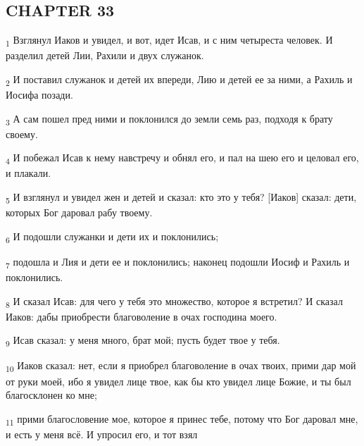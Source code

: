 \subsection{CHAPTER 33}
\begin{tcolorbox}
\textsubscript{1} Взглянул Иаков и увидел, и вот, идет Исав, и с ним четыреста человек. И разделил детей Лии, Рахили и двух служанок.
\end{tcolorbox}
\begin{tcolorbox}
\textsubscript{2} И поставил служанок и детей их впереди, Лию и детей ее за ними, а Рахиль и Иосифа позади.
\end{tcolorbox}
\begin{tcolorbox}
\textsubscript{3} А сам пошел пред ними и поклонился до земли семь раз, подходя к брату своему.
\end{tcolorbox}
\begin{tcolorbox}
\textsubscript{4} И побежал Исав к нему навстречу и обнял его, и пал на шею его и целовал его, и плакали.
\end{tcolorbox}
\begin{tcolorbox}
\textsubscript{5} И взглянул и увидел жен и детей и сказал: кто это у тебя? [Иаков] сказал: дети, которых Бог даровал рабу твоему.
\end{tcolorbox}
\begin{tcolorbox}
\textsubscript{6} И подошли служанки и дети их и поклонились;
\end{tcolorbox}
\begin{tcolorbox}
\textsubscript{7} подошла и Лия и дети ее и поклонились; наконец подошли Иосиф и Рахиль и поклонились.
\end{tcolorbox}
\begin{tcolorbox}
\textsubscript{8} И сказал Исав: для чего у тебя это множество, которое я встретил? И сказал Иаков: дабы приобрести благоволение в очах господина моего.
\end{tcolorbox}
\begin{tcolorbox}
\textsubscript{9} Исав сказал: у меня много, брат мой; пусть будет твое у тебя.
\end{tcolorbox}
\begin{tcolorbox}
\textsubscript{10} Иаков сказал: нет, если я приобрел благоволение в очах твоих, прими дар мой от руки моей, ибо я увидел лице твое, как бы кто увидел лице Божие, и ты был благосклонен ко мне;
\end{tcolorbox}
\begin{tcolorbox}
\textsubscript{11} прими благословение мое, которое я принес тебе, потому что Бог даровал мне, и есть у меня всё. И упросил его, и тот взял
\end{tcolorbox}
